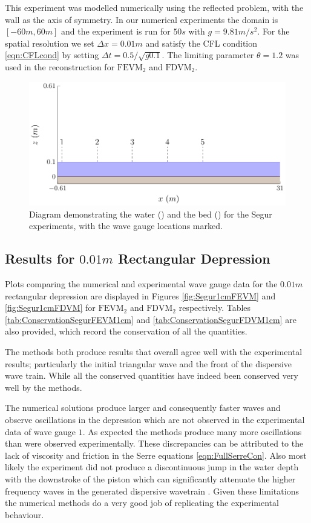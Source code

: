 This experiment was modelled numerically using the reflected problem, with the wall as the axis of symmetry. In our numerical experiments the domain is $[-60m,60m]$ and the experiment is run for $ 50s$ with $g = 9.81m/s^2$. For the spatial resolution we set $\Delta x = 0.01m$ and satisfy the CFL condition \eqref{eqn:CFLcond} by setting $\Delta t = 0.5 / \sqrt{g 0.1}$. The limiting parameter $\theta = 1.2$ was used in the reconstruction for $\text{FEVM}_2$ and $\text{FDVM}_2$.

\begin{figure}
	\centering
	\includegraphics[width=\textwidth]{./chp6/figures/Experiment/Segur/WaveTank.pdf}
	\caption{Diagram demonstrating the water () and the bed () for the Segur experiments, with the wave gauge locations marked.}
	\label{fig:SegurWT}
\end{figure}

\subsection{Results for $0.01m$ Rectangular Depression}

Plots comparing the numerical and experimental wave gauge data for the $0.01m$ rectangular depression are displayed in Figures \ref{fig:Segur1cmFEVM} and \ref{fig:Segur1cmFDVM} for $\text{FEVM}_2$ and $\text{FDVM}_2$ respectively. Tables \ref{tab:ConservationSegurFEVM1cm} and \ref{tab:ConservationSegurFDVM1cm} are also provided, which record the conservation of all the quantities. 

The methods both produce results that overall agree well with the experimental results; particularly the initial triangular wave and the front of the dispersive wave train. While all the conserved quantities have indeed been conserved very well by the methods.  

The numerical solutions produce larger and consequently faster waves and observe oscillations in the depression which are not observed in the experimental data of wave gauge $1$. As expected the methods produce many more oscillations than were observed experimentally. These discrepancies can be attributed to the lack of viscosity and friction in the Serre equations \eqref{eqn:FullSerreCon}. Also most likely the experiment did not produce a discontinuous jump in the water depth with the downstroke of the piston which can significantly attenuate the higher frequency waves in the generated dispersive wavetrain \cite{Pitt-2018-61}. Given these limitations the numerical methods do a very good job of replicating the experimental behaviour. 


